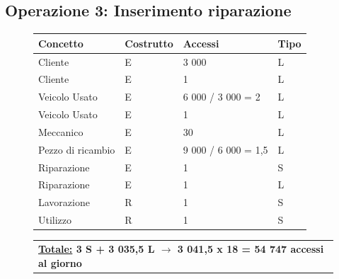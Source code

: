 \documentclass[a4paper,12pt]{report}
\begin{document}
\subsection*{Operazione 3: Inserimento riparazione}
\begin{figure}[ht]
	\centering
	\begin{tabular}{L{3.5cm}C{2cm}C{4.5cm}C{2cm}}
		\rule[-2mm]{0mm}{0.6cm}{}
		\textbf{Concetto} & \textbf{Costrutto} &\textbf{Accessi} & \textbf{Tipo} \\
		\hline\rule[-2mm]{0mm}{0.65cm}{}
		Cliente & E & 3 000 & L \\
		\hline\rule[-2mm]{0mm}{0.65cm}{}
		Cliente & E & 1 & L \\
		\hline\rule[-2mm]{0mm}{0.65cm}{}
		Veicolo Usato & E & 6 000 / 3 000 = 2 & L \\
		\hline\rule[-2mm]{0mm}{0.65cm}{}
		Veicolo Usato & E & 1 & L \\
		\hline\rule[-2mm]{0mm}{0.65cm}{}
		Meccanico & E & 30 & L \\
		\hline\rule[-2mm]{0mm}{0.65cm}{}
		Pezzo di ricambio & E & 9 000 / 6 000 = 1,5 & L \\
		\hline\rule[-2mm]{0mm}{0.65cm}{}
		Riparazione & E & 1 & S \\
		\hline\rule[-2mm]{0mm}{0.65cm}{}
		Riparazione & E & 1 & L \\
		\hline\rule[-2mm]{0mm}{0.65cm}{}
		Lavorazione & R & 1 & S \\
		\hline\rule[-2mm]{0mm}{0.65cm}{}
		Utilizzo & R & 1 & S \\
	\end{tabular}
	
	\begin{tabular}{C{13.9cm}}
		\rule[-3mm]{0mm}{0.85cm}{}	
		 \textbf{\underline{Totale:} 3 S +  3 035,5 L $\to$ 3 041,5 x 18 = 54 747 accessi al giorno}
	\end{tabular}
\end{figure}

\newpage
\end{document}

